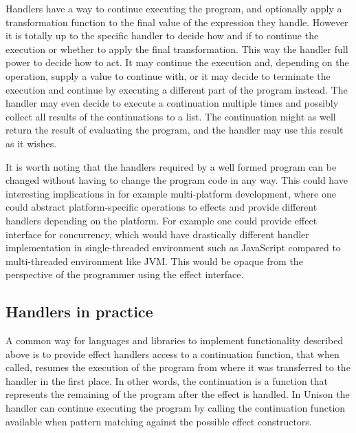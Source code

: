 Handlers have a way to continue executing the program, and optionally apply a transformation function to the final value of the expression they handle. However it is totally up to the specific handler to decide how and if to continue the execution or whether to apply the final transformation. This way the handler full power to decide how to act. It may continue the execution and, depending on the operation, supply a value to continue with, or it may decide to terminate the execution and continue by executing a different part of the program instead. The handler may even decide to execute a continuation multiple times and possibly collect all results of the continuations to a list. The continuation might as well return the result of evaluating the program, and the handler may use this result as it wishes.

It is worth noting that the handlers required by a well formed program can be changed without having to change the program code in any way. This could have interesting implications in for example multi-platform development, where one could abstract platform-specific operations to effects and provide different handlers depending on the platform. For example one could provide effect interface for concurrency, which would have drastically different handler implementation in single-threaded environment such as JavaScript compared to multi-threaded environment like JVM. This would be opaque from the perspective of the programmer using the effect interface.

\subsection{Handlers in practice}
A common way for languages and libraries to implement functionality described above is to provide effect handlers access to a continuation function, that when called, resumes the execution of the program from where it was transferred to the handler in the first place. In other words, the continuation is a function that represents the remaining of the program after the effect is handled. In Unison the handler can continue executing the program by calling the continuation function available when pattern matching against the possible effect constructors.

